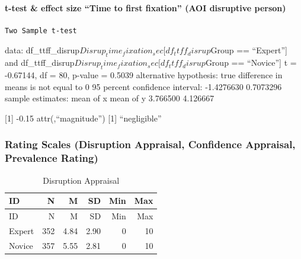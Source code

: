 \documentclass[
]{article}
\begin{document}
\paragraph{t-test \& effect size ``Time to first fixation'' (AOI
disruptive
person)}\label{t-test-effect-size-time-to-first-fixation-aoi-disruptive-person}

\begin{verbatim}
Two Sample t-test
\end{verbatim}

data: df\_ttff\_disrup\(Disrup_time_fixation_sec[df_ttff_disrup\)Group
== ``Expert''{]} and
df\_ttff\_disrup\(Disrup_time_fixation_sec[df_ttff_disrup\)Group ==
``Novice''{]} t = -0.67144, df = 80, p-value = 0.5039 alternative
hypothesis: true difference in means is not equal to 0 95 percent
confidence interval: -1.4276630 0.7073296 sample estimates: mean of x
mean of y 3.766500 4.126667

{[}1{]} -0.15 attr(,``magnitude'') {[}1{]} ``negligible''

\subsubsection{Rating Scales (Disruption Appraisal, Confidence
Appraisal, Prevalence
Rating)}\label{rating-scales-disruption-appraisal-confidence-appraisal-prevalence-rating}

\begin{longtable}[]{@{}lrrrrr@{}}
\caption{Disruption Appraisal}\tabularnewline
\toprule\noalign{}
ID & N & M & SD & Min & Max \\
\midrule\noalign{}
\endfirsthead
\toprule\noalign{}
ID & N & M & SD & Min & Max \\
\midrule\noalign{}
\endhead
\bottomrule\noalign{}
\endlastfoot
Expert & 352 & 4.84 & 2.90 & 0 & 10 \\
Novice & 357 & 5.55 & 2.81 & 0 & 10 \\
\end{longtable}
\end{document}

